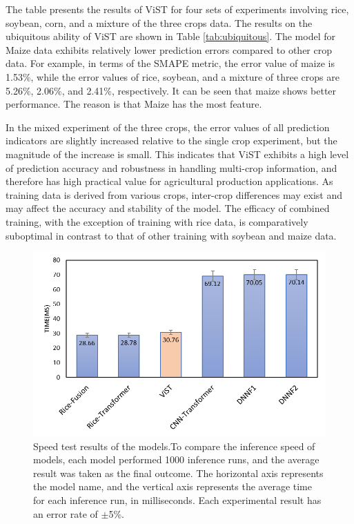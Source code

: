 \documentclass[acmsmall,manuscript, screen, review]{acmart}
\begin{document}
The table presents the results of ViST for four sets of experiments involving rice, soybean, corn, and a mixture of the three crops data. The results on the ubiquitous ability of ViST are shown in Table \ref{tab:ubiquitous}. The model for Maize data exhibits relatively lower prediction errors compared to other crop data. For example, in terms of the SMAPE metric, the error value of maize is 1.53\%, while the error values of rice, soybean, and a mixture of three crops are 5.26\%, 2.06\%, and 2.41\%, respectively. It can be seen that maize shows better performance. The reason is that Maize has the most feature.

In the mixed experiment of the three crops, the error values of all prediction indicators are slightly increased relative to the single crop experiment, but the magnitude of the increase is small. This indicates that ViST exhibits a high level of prediction accuracy and robustness in handling multi-crop information, and therefore has high practical value for agricultural production applications. As training data is derived from various crops, inter-crop differences may exist and may affect the accuracy and stability of the model. The efficacy of combined training, with the exception of training with rice data, is comparatively suboptimal in contrast to that of other training with soybean and maize data.
\begin{figure}[h]
  \centering
  \includegraphics[width=0.6\linewidth]{pic/speed_test.png}
  \caption{Speed test results of the models.To compare the inference speed of models, each model performed 1000 inference runs, and the average result was taken as the final outcome. The horizontal axis represents the model name, and the vertical axis represents the average time for each inference run, in milliseconds. Each experimental result has an error rate of \begin{math}
    \pm
  \end{math}5\%.}
  \label{speed_test}
\end{figure}
\end{document}
